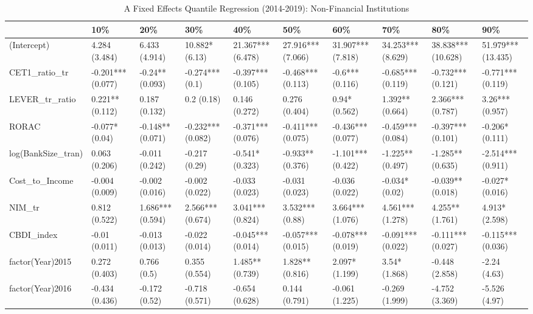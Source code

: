 \begin{table}[ht]
\centering
\caption{A Fixed Effects Quantile Regression (2014-2019): Non-Financial Institutions} 
\begingroup\small
\begin{tabular}{llllllllll}
  \toprule
 & 10\% & 20\% & 30\% & 40\% & 50\% & 60\% & 70\% & 80\% & 90\% \\ 
  \midrule
(Intercept) & 4.284 (3.484) & 6.433 (4.914) & 10.882* (6.13) & 21.367*** (6.478) & 27.916*** (7.066) & 31.907*** (7.818) & 34.253*** (8.629) & 38.838*** (10.628) & 51.979*** (13.435) \\ 
  CET1\_ratio\_tr & -0.201*** (0.077) & -0.24** (0.093) & -0.274*** (0.1) & -0.397*** (0.105) & -0.468*** (0.113) & -0.6*** (0.116) & -0.685*** (0.119) & -0.732*** (0.121) & -0.771*** (0.119) \\ 
  LEVER\_tr\_ratio & 0.221** (0.112) & 0.187 (0.132) & 0.2 (0.18) & 0.146 (0.272) & 0.276 (0.404) & 0.94* (0.562) & 1.392** (0.664) & 2.366*** (0.787) & 3.26*** (0.957) \\ 
  RORAC & -0.077* (0.04) & -0.148** (0.071) & -0.232*** (0.082) & -0.371*** (0.076) & -0.411*** (0.075) & -0.436*** (0.077) & -0.459*** (0.084) & -0.397*** (0.101) & -0.206* (0.111) \\ 
  log(BankSize\_tran) & 0.063 (0.206) & -0.011 (0.242) & -0.217 (0.29) & -0.541* (0.323) & -0.933** (0.376) & -1.101*** (0.422) & -1.225** (0.497) & -1.285** (0.635) & -2.514*** (0.911) \\ 
  Cost\_to\_Income & -0.004 (0.009) & -0.002 (0.016) & -0.002 (0.022) & -0.033 (0.023) & -0.031 (0.023) & -0.036 (0.022) & -0.034* (0.02) & -0.039** (0.018) & -0.027* (0.016) \\ 
  NIM\_tr & 0.812 (0.522) & 1.686*** (0.594) & 2.566*** (0.674) & 3.041*** (0.824) & 3.532*** (0.88) & 3.664*** (1.076) & 4.561*** (1.278) & 4.255** (1.761) & 4.913* (2.598) \\ 
  CBDI\_index & -0.01 (0.011) & -0.013 (0.013) & -0.022 (0.014) & -0.045*** (0.014) & -0.057*** (0.015) & -0.078*** (0.019) & -0.091*** (0.022) & -0.111*** (0.027) & -0.115*** (0.036) \\ 
  factor(Year)2015 & 0.272 (0.403) & 0.766 (0.5) & 0.355 (0.554) & 1.485** (0.739) & 1.828** (0.816) & 2.097* (1.199) & 3.54* (1.868) & -0.448 (2.858) & -2.24 (4.63) \\ 
  factor(Year)2016 & -0.434 (0.436) & -0.172 (0.52) & -0.718 (0.571) & -0.654 (0.628) & 0.144 (0.791) & -0.061 (1.225) & -0.269 (1.999) & -4.752 (3.369) & -5.526 (4.97) \\ 

\end{tabular}
\end{table}
